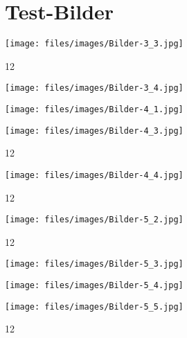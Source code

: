 \section{Test-Bilder}



\texttt{[image: files/images/Bilder-3\_3.jpg]}

12

\texttt{[image: files/images/Bilder-3\_4.jpg]}

\texttt{[image: files/images/Bilder-4\_1.jpg]}


\texttt{[image: files/images/Bilder-4\_3.jpg]}

12

\texttt{[image: files/images/Bilder-4\_4.jpg]}


12

\texttt{[image: files/images/Bilder-5\_2.jpg]}

12

\texttt{[image: files/images/Bilder-5\_3.jpg]}

\texttt{[image: files/images/Bilder-5\_4.jpg]}

\texttt{[image: files/images/Bilder-5\_5.jpg]}

12